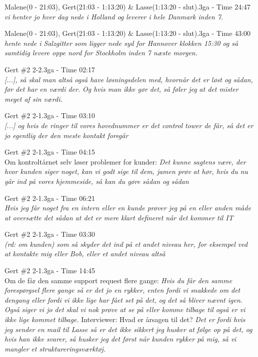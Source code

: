\begin{thebibliography}{9}

	Malene(0 - 21:03), Gert(21:03 - 1:13:20) \& Lasse(1:13:20 - slut).3ga - Time 24:47\\
	\textit{vi henter jo hver dag nede i Holland og leverer i hele Danmark inden 7.}

	Malene(0 - 21:03), Gert(21:03 - 1:13:20) \& Lasse(1:13:20 - slut).3ga - Time 43:00\\
\textit{hente nede i Salzgitter som ligger nede syd for Hannover klokken 15:30 og så samtidig levere oppe nord for Stockholm inden 7 næste morgen.}

	Gert \#2 2-2.3ga - Time 02:17\\
	\textit{[...], så skal man altså også have løsningsdelen med, hvornår det er løst og sådan, før det har en værdi der. Og hvis man ikke gør det, så føler jeg at det mister meget af sin værdi.}

Gert \#2 2-1.3ga - Time 03:10\\
	\textit{[...] og hvis de ringer til vores hovednummer er det control tower de får, så det er jo egentlig der den meste kontakt foregår}

	Gert \#2 2-1.3ga - Time 04:15\\
	Om kontroltårnet selv løser problemer for kunder: \textit{Det kunne sagtens være, der hvor kunden siger noget, kan vi godt sige til dem, jamen prøv at hør, hvis du nu går ind på vores hjemmeside, så kan du gøre sådan og sådan}

Gert \#2 2-1.3ga - Time 06:21\\
	\textit{Hvis jeg får noget fra en intern eller en kunde prøver jeg på en eller anden måde at oversætte det sådan at det er mere klart defineret når det kommer til IT}

	Gert \#2 2-1.3ga - Time 03:30\\
	\textit{\emph{(rd: om kunden)} som så skyder det ind på et andet niveau her, for eksempel ved at kontakte mig eller Bob, eller et andet niveau altså}

	Gert \#2 2-1.3ga - Time 14:45\\
	Om de får den samme support request flere gange: \textit{Hvis du får den samme forespørgsel flere gange så er det jo en rykker, enten fordi vi snakkede om det dengang eller fordi vi ikke lige har fået set på det, og det så bliver nævnt igen. Også siger vi jo det skal vi nok prøve at se på eller komme tilbage til også er vi ikke lige kommet tilbage.} Interviewer: Hvad er årsagen til det? \textit{Det er fordi hvis jeg sender en mail til Lasse så er det ikke sikkert jeg husker at følge op på det, og hvis han ikke svarer, så husker jeg det først når kunden rykker på mig, så vi mangler et struktureringsværktøj.}


\end{thebibliography}
